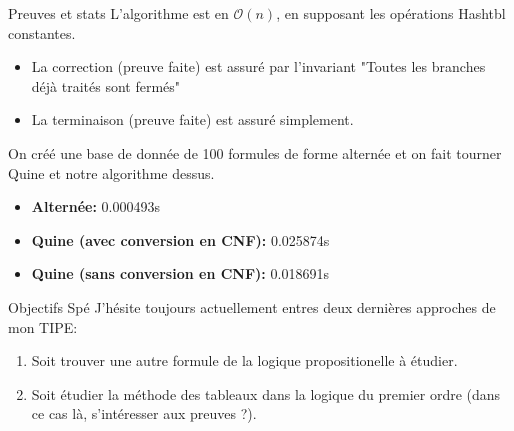 \documentclass[]{beamer}
\begin{document}
\begin{frame}{Preuves et stats}
    L'algorithme est en $\mathcal{O}(n)$, en supposant les opérations Hashtbl constantes.
    \pause
    \begin{itemize}
        \item La correction (preuve faite) est assuré par l'invariant "Toutes les branches déjà traités sont fermés"
        \item La terminaison (preuve faite) est assuré simplement.
    \end{itemize}
    \pause
    On créé une base de donnée de 100 formules de forme alternée et on fait tourner Quine et notre algorithme dessus.
    \begin{itemize}
        \item \textbf{Alternée:} 0.000493s
        \item \textbf{Quine (avec conversion en CNF):} 0.025874s
        \item \textbf{Quine (sans conversion en CNF):} 0.018691s
    \end{itemize}  
\end{frame}
 
\begin{frame}{Objectifs Spé}
    J'hésite toujours actuellement entres deux dernières approches de mon TIPE:
    \begin{enumerate}
        \item Soit trouver une autre formule de la logique propositionelle à étudier.
        \item Soit étudier la méthode des tableaux dans la logique du premier ordre (dans ce cas là, s'intéresser aux preuves ?).
    \end{enumerate}
\end{frame}
\end{document}
